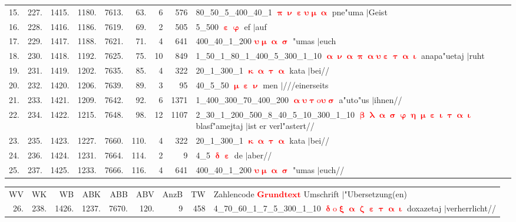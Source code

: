 \documentclass[a4paper,10pt,landscape]{article}
\begin{document}
\begin{tabular}{rrrrrrrrp{120mm}}
15.&227.&1415.&1180.&7613.&63.&6&576&80\_50\_5\_400\_40\_1 \textcolor{red}{$\boldsymbol{\uppi\upnu\upepsilon\upsilon\upmu\upalpha}$} pne"uma $|$Geist\\
16.&228.&1416.&1186.&7619.&69.&2&505&5\_500 \textcolor{red}{$\boldsymbol{\upepsilon\upvarphi}$} ef $|$auf\\
17.&229.&1417.&1188.&7621.&71.&4&641&400\_40\_1\_200 \textcolor{red}{$\boldsymbol{\upsilon\upmu\upalpha\upsigma}$} "umas $|$euch\\
18.&230.&1418.&1192.&7625.&75.&10&849&1\_50\_1\_80\_1\_400\_5\_300\_1\_10 \textcolor{red}{$\boldsymbol{\upalpha\upnu\upalpha\uppi\upalpha\upsilon\upepsilon\uptau\upalpha\upiota}$} anapa"uetaj $|$ruht\\
19.&231.&1419.&1202.&7635.&85.&4&322&20\_1\_300\_1 \textcolor{red}{$\boldsymbol{\upkappa\upalpha\uptau\upalpha}$} kata $|$bei//\\
20.&232.&1420.&1206.&7639.&89.&3&95&40\_5\_50 \textcolor{red}{$\boldsymbol{\upmu\upepsilon\upnu}$} men $|$///einerseits\\
21.&233.&1421.&1209.&7642.&92.&6&1371&1\_400\_300\_70\_400\_200 \textcolor{red}{$\boldsymbol{\upalpha\upsilon\uptau\mathrm{o}\upsilon\upsigma}$} a"uto"us $|$ihnen//\\
22.&234.&1422.&1215.&7648.&98.&12&1107&2\_30\_1\_200\_500\_8\_40\_5\_10\_300\_1\_10 \textcolor{red}{$\boldsymbol{\upbeta\uplambda\upalpha\upsigma\upvarphi\upeta\upmu\upepsilon\upiota\uptau\upalpha\upiota}$} blasf"amejtaj $|$ist er verl"astert//\\
23.&235.&1423.&1227.&7660.&110.&4&322&20\_1\_300\_1 \textcolor{red}{$\boldsymbol{\upkappa\upalpha\uptau\upalpha}$} kata $|$bei//\\
24.&236.&1424.&1231.&7664.&114.&2&9&4\_5 \textcolor{red}{$\boldsymbol{\updelta\upepsilon}$} de $|$aber//\\
25.&237.&1425.&1233.&7666.&116.&4&641&400\_40\_1\_200 \textcolor{red}{$\boldsymbol{\upsilon\upmu\upalpha\upsigma}$} "umas $|$euch//\\
\end{tabular}
\newpage
\begin{tabular}{rrrrrrrrp{120mm}}
WV&WK&WB&ABK&ABB&ABV&AnzB&TW&Zahlencode \textcolor{red}{$\boldsymbol{Grundtext}$} Umschrift $|$"Ubersetzung(en)\\
26.&238.&1426.&1237.&7670.&120.&9&458&4\_70\_60\_1\_7\_5\_300\_1\_10 \textcolor{red}{$\boldsymbol{\updelta\mathrm{o}\upxi\upalpha\upzeta\upepsilon\uptau\upalpha\upiota}$} doxazetaj $|$verherrlicht//\\
\end{tabular}\medskip \\
\end{document}
